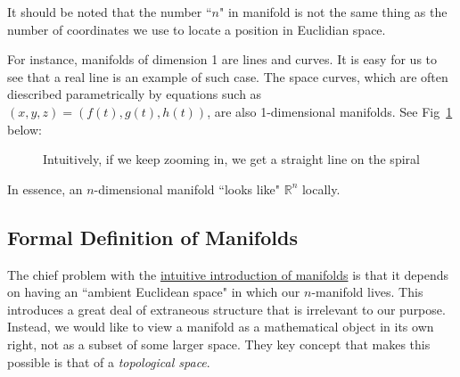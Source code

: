 \begin{tcolorbox}[
    parbox=false,
    enhanced,
    colback=red!5!white,colframe=red!75!black,
    watermark tikz={\draw[line width=2mm] circle (1cm) node{\fontfamily{ptm}\fontseries{b}\fontsize{20mm}{20mm}\selectfont !};}
]
    It should be noted that the number ``$n$" in manifold is not the same thing as the number of coordinates we use to
    locate a position in Euclidian space.

    For instance, manifolds of dimension 1 are lines and curves. It is easy for us to see that a real line is an example
    of such case. The space curves, which are often diescribed parametrically by equations such as
    $(x, y, z) = (f(t), g(t), h(t))$, are also 1-dimensional manifolds. See Fig~\ref{fig:spiral} below:

    \begin{figure}[H]
        \centering
        \caption{Intuitively, if we keep zooming in, we get a straight line on the spiral}
        \label{fig:spiral}
    \end{figure}
\end{tcolorbox}

In essence, an $n$-dimensional manifold ``looks like" $\mathbb{R}^n$ locally.

\subsection{Formal Definition of Manifolds}

The chief problem with the \hyperref[subsec:intuitive-manifolds]{intuitive introduction of manifolds} is that it depends
on having an ``ambient Euclidean space" in which our $n$-manifold lives. This introduces a great deal of extraneous
structure that is irrelevant to our purpose. Instead, we would like to view a manifold as a mathematical object in its
own right, not as a subset of some larger space. They key concept that makes this possible is that of a
\textit{topological space}.



